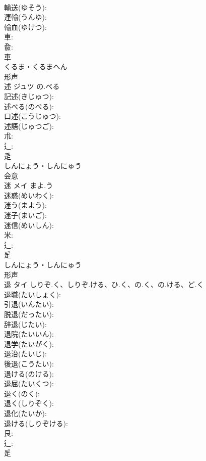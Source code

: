 \documentclass[8pt]{extreport}
\begin{document}
\begin{CJK}{UTF8}{min}
\\	輸送(ゆそう): 
\\	運輸(うんゆ): 
\\	輸血(ゆけつ): 
\\	車: 
\\	兪: 
\\	車	
\\	くるま・くるまへん	
\\	形声 
\\	述	ジュツ	の.べる		
\\	記述(きじゅつ): 
\\	述べる(のべる): 
\\	口述(こうじゅつ): 
\\	述語(じゅつご): 
\\	朮: 
\\	辶: 
\\	辵	
\\	しんにょう・しんにゅう	
\\	会意 
\\	迷	メイ	まよ.う		
\\	迷惑(めいわく): 
\\	迷う(まよう): 
\\	迷子(まいご): 
\\	迷信(めいしん): 
\\	米: 
\\	辶: 
\\	辵	
\\	しんにょう・しんにゅう	
\\	形声 
\\	退	タイ	しりぞ.く、しりぞ.ける、ひ.く、の.く、の.ける、ど.く		
\\	退職(たいしょく): 
\\	引退(いんたい): 
\\	脱退(だったい): 
\\	辞退(じたい): 
\\	退院(たいいん): 
\\	退学(たいがく): 
\\	退治(たいじ): 
\\	後退(こうたい): 
\\	退ける(のける): 
\\	退屈(たいくつ): 
\\	退く(のく): 
\\	退く(しりぞく): 
\\	退化(たいか): 
\\	退ける(しりぞける): 
\\	艮: 
\\	辶: 
\\	辵	

\end{CJK}
\end{document}
